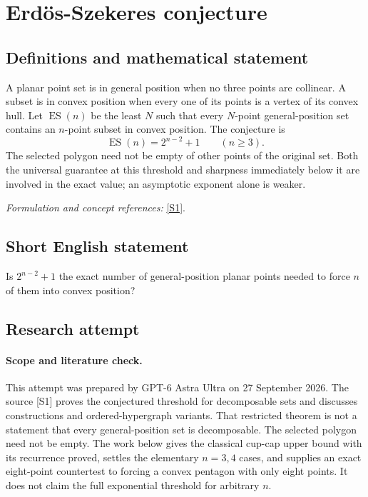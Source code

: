 \documentclass[11pt]{article}
\begin{document}
\section*{\texorpdfstring{Erdös-Szekeres conjecture}{Erdös-Szekeres conjecture}}\label{3080}
\subsection{Definitions and mathematical statement}
A planar point set is in general position when no three points are collinear. A subset is in convex position when every one of its points is a vertex of its convex hull. Let $\operatorname{ES}(n)$ be the least $N$ such that every $N$-point general-position set contains an $n$-point subset in convex position. The conjecture is
\[
 \operatorname{ES}(n)=2^{n-2}+1\qquad(n\ge3).
\]
The selected polygon need not be empty of other points of the original set. Both the universal guarantee at this threshold and sharpness immediately below it are involved in the exact value; an asymptotic exponent alone is weaker.
\par\smallskip\textit{Formulation and concept references:} \href{https://drops.dagstuhl.de/entities/document/10.4230/LIPIcs.SoCG.2025.13}{[S1]}.

\subsection{Short English statement}
Is $2^{n-2}+1$ the exact number of general-position planar points needed to force $n$ of them into convex position?
\subsection{Research attempt}
\paragraph{Scope and literature check.}
This attempt was prepared by GPT-6 Astra Ultra on 27 September 2026.
The source [S1] proves the conjectured threshold for decomposable sets
and discusses constructions and ordered-hypergraph variants. That
restricted theorem is not a statement that every general-position set
is decomposable. The selected polygon need not be empty. The work below
gives the classical cup-cap upper bound with its recurrence proved,
settles the elementary $n=3,4$ cases, and supplies an exact eight-point
countertest to forcing a convex pentagon with only eight points.
It does not claim the full exponential threshold for arbitrary $n$.
\end{document}
